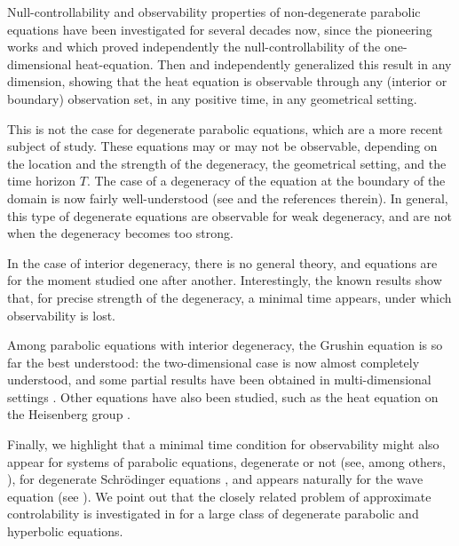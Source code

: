 \documentclass[JEP,XML,SOM,Unicode]{cedram}
\theoremstyle{plain}
\theoremstyle{definition}
\newcommand{\1}{\mathds 1}
\begin{document}
Null-controllability and observability properties of non-degenerate parabolic equations have been investigated
for several decades now, since the pioneering works \cite{egorov} and \cite{fattorini_russel} which proved independently the null-controllability of the one-dimensional heat-equation. Then \cite{Lebeau_Robbiano}
and \cite{Fursikov_Imanuvilov} independently generalized this result in any dimension, showing
that the heat equation is observable through any (interior or boundary) observation set, in any positive time, in any
geometrical setting.

This is not the case for degenerate parabolic equations, which are a more recent subject of study. These equations
may or may not be observable, depending on the location and the strength of the degeneracy, the geometrical setting, and the time horizon $T$.
The case of a degeneracy of the equation at the boundary of the domain
is now fairly well-understood (see \cite{Cannarsa_Martinez_Vancostenoble} and the references therein). In general, this type of degenerate equations are observable for weak degeneracy, and are not when the degeneracy becomes too strong.

In the case of interior
degeneracy, there is no general theory, and equations are for the moment studied one after another.
Interestingly, the known results show that, for precise strength of the degeneracy, a minimal time
appears, under which observability is lost.

Among parabolic equations with interior degeneracy, the Grushin equation is so far the best understood: the two-dimensional case is now
almost completely understood, and some partial results have been obtained in multi-dimensional settings \cite{Beauchard_Cannarsa_Guglielmi,Beauchard_Miller_Morancey,Koenig17,Lissy19,Beauchard_Darde_Ervedoza,Duprez_Koenig,Allonsius_Boyer_Morancey}. Other equations have also been studied, such as the heat equation on the Heisenberg group \cite{Beauchard_Cannarsa}.

Finally, we highlight that a minimal time condition for observability might also appear for systems of parabolic equations, degenerate or not (see, among others, \cite{AmmarKhodja_Benabdallah_GonzalesBurgos_deTeresa,Duprez,Benabdallah_Boyer_Morancey}),
for degenerate Schrödinger equations \cite{Burq_Sun_19,LetrouitSun20}, and appears naturally for the wave equation (see \cite{raucht74,bardoslr92}). We point out that the closely related problem of approximate controlability
is investigated in \cite{LaurentLeautaud18} for a large class of degenerate parabolic and hyperbolic equations.
\end{document}
